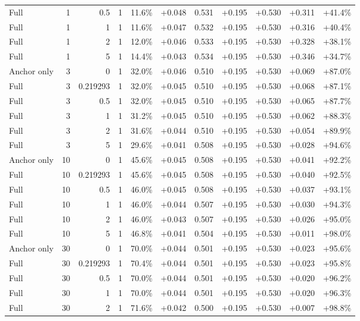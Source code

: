 \begin{table}[htbp]
\begin{tabular}{lrrrccccccc}
Full & 1 & 0.5 & 1 & 11.6\% & +0.048 & 0.531 & +0.195 & +0.530 & +0.311 & +41.4\% \\
Full & 1 & 1 & 1 & 11.6\% & +0.047 & 0.532 & +0.195 & +0.530 & +0.316 & +40.4\% \\
Full & 1 & 2 & 1 & 12.0\% & +0.046 & 0.533 & +0.195 & +0.530 & +0.328 & +38.1\% \\
Full & 1 & 5 & 1 & 14.4\% & +0.043 & 0.534 & +0.195 & +0.530 & +0.346 & +34.7\% \\
Anchor only & 3 & 0 & 1 & 32.0\% & +0.046 & 0.510 & +0.195 & +0.530 & +0.069 & +87.0\% \\
Full & 3 & 0.219293 & 1 & 32.0\% & +0.045 & 0.510 & +0.195 & +0.530 & +0.068 & +87.1\% \\
Full & 3 & 0.5 & 1 & 32.0\% & +0.045 & 0.510 & +0.195 & +0.530 & +0.065 & +87.7\% \\
Full & 3 & 1 & 1 & 31.2\% & +0.045 & 0.510 & +0.195 & +0.530 & +0.062 & +88.3\% \\
Full & 3 & 2 & 1 & 31.6\% & +0.044 & 0.510 & +0.195 & +0.530 & +0.054 & +89.9\% \\
Full & 3 & 5 & 1 & 29.6\% & +0.041 & 0.508 & +0.195 & +0.530 & +0.028 & +94.6\% \\
Anchor only & 10 & 0 & 1 & 45.6\% & +0.045 & 0.508 & +0.195 & +0.530 & +0.041 & +92.2\% \\
Full & 10 & 0.219293 & 1 & 45.6\% & +0.045 & 0.508 & +0.195 & +0.530 & +0.040 & +92.5\% \\
Full & 10 & 0.5 & 1 & 46.0\% & +0.045 & 0.508 & +0.195 & +0.530 & +0.037 & +93.1\% \\
Full & 10 & 1 & 1 & 46.0\% & +0.044 & 0.507 & +0.195 & +0.530 & +0.030 & +94.3\% \\
Full & 10 & 2 & 1 & 46.0\% & +0.043 & 0.507 & +0.195 & +0.530 & +0.026 & +95.0\% \\
Full & 10 & 5 & 1 & 46.8\% & +0.041 & 0.504 & +0.195 & +0.530 & +0.011 & +98.0\% \\
Anchor only & 30 & 0 & 1 & 70.0\% & +0.044 & 0.501 & +0.195 & +0.530 & +0.023 & +95.6\% \\
Full & 30 & 0.219293 & 1 & 70.4\% & +0.044 & 0.501 & +0.195 & +0.530 & +0.023 & +95.8\% \\
Full & 30 & 0.5 & 1 & 70.0\% & +0.044 & 0.501 & +0.195 & +0.530 & +0.020 & +96.2\% \\
Full & 30 & 1 & 1 & 70.0\% & +0.044 & 0.501 & +0.195 & +0.530 & +0.020 & +96.3\% \\
Full & 30 & 2 & 1 & 71.6\% & +0.042 & 0.500 & +0.195 & +0.530 & +0.007 & +98.8\% \\

\end{tabular}
\end{table}
